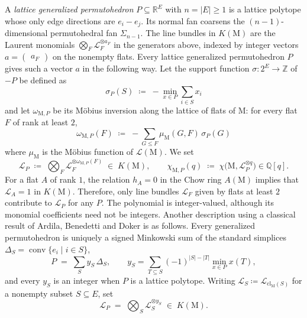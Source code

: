 \documentclass[11pt,a4paper,reqno]{amsart}
\theoremstyle{results}
\theoremstyle{definitions}
\def\Z{\mathbb{Z}}
\def\Q{\mathbb{Q}}
\def\R{\mathbb{R}}
\def\Z{\mathbb{Z}}
\def\calL{\mathcal{L}}
\newcommand{\abs}[1]{\left\lvert#1\right\rvert}
\newcommand{\cl}{\textrm{cl}}
\newcommand{\M}{\mathrm{M}}
\newcommand{\cL}{\mathcal{L}}
\begin{document}
A \emph{lattice generalized permutohedron} $P \subseteq \R^{E}$ with $n = \abs{E} \geqslant 1$ is a lattice polytope whose only edge directions are $e_{i} - e_j$.
Its normal fan coarsens the $(n-1)$-dimensional permutohedral fan
$\Sigma_{n-1}$. The line bundles in $K(\M)$ are the Laurent monomials
$\bigotimes_{F} \cL_F^{\otimes a_F}$ in the generators above, indexed by integer
vectors $a = \begin{pmatrix}a_F\end{pmatrix}$ on the nonempty flats. Every lattice generalized permutohedron $P$ gives such a vector $a$ in the following way. Let the support function $\sigma \colon 2^{E} \to \Z$ of $-P$ be defined as
\[
  \sigma_P(S) \;\coloneqq\; -\min_{x \in P} \sum_{i \in S} x_i
\]
and let $\omega_{\M, P}$ be its M\"obius inversion along
the lattice of flats of $\M$: for every flat $F$ of rank at least $2$,
\begin{equation}\label{eq:moebius}
  \omega_{\M, P}(F) \;\coloneqq\; -\sum_{G \leqslant F} \mu_{\M}(G,F)\, \sigma_P(G)
\end{equation}
where $\mu_{\M}$ is the M\"obius function of $\calL(\M)$. We set
\begin{equation}\label{eq:LP-flats}
  \cL_P \;\coloneqq\; \bigotimes_{F} \cL_F^{\otimes \omega_{\M, P}(F)} \;\in\; K(\M),
  \qquad
  \chi_{\M,P}(q) \;\coloneqq\; \chi\big(\M, \cL_P^{\otimes q}\big) \in \Q[q].
\end{equation}
For a flat $A$ of rank $1$, the relation $h_A=0$ in the Chow ring $A(\M)$ implies that $\cL_A=1$ in $K(\M)$.
Therefore, only line bundles $\cL_F$ given by flats at least $2$ contribute to $\cL_P$ for any $P$. 
The polynomial is integer-valued, although its monomial coefficients need
not be integers.  Another description using a classical result of
Ardila, Benedetti and Doker \cite[Proposition 2.4]{ardila2010matroid} is as follows. Every
generalized permutohedron is uniquely a signed Minkowski sum of the standard
simplices $\Delta_S = \operatorname{conv}\{e_i \mid i \in S\}$,
\begin{equation}\label{eq:signed-minkowski}
  P \;=\; \sum_{S} y_S\, \Delta_S ,
  \qquad
  y_S = \sum_{T \subseteq S} (-1)^{\abs{S} - \abs{T}} \min_{x \in P} x(T) ,
\end{equation}
and every $y_S$ is an integer when $P$ is a lattice polytope.  Writing
$\cL_S \coloneqq \cL_{\cl_{\M}(S)}$ for a nonempty subset $S \subseteq E$, set
\begin{equation}\label{eq:LP}
  \cL_P \;=\; \bigotimes_{S} \cL_{S}^{\otimes y_S} \;\in\; K(\M) .
\end{equation}
\end{document}
